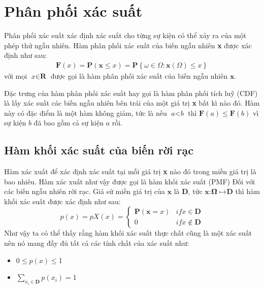 \section{Phân phối xác suất}\label{sec:1.2}
Phân phối xác suất xác định xác suất cho từng sự kiện có thể xảy ra của một phép thử ngẫu nhiên. Hàm phân phối xác suất của biến ngẫu nhiên \textbf{x} được xác định như sau:
\begin{align}
	\textbf{F}(x)=\textbf{P}(\textbf{x}\leq\textit{x})=\textbf{P}\left\{{\omega\in\Omega:\textbf{x}(\Omega)\leq\textit{x}} \right\}
\end{align}
với mọi $\textit{x}\in\textbf{R}$ được gọi là hàm phân phối xác suất của biến ngẫu nhiên $\textbf{x}$.

Đặc trưng của hàm phân phối xác suất hay gọi là hàm phân phối tích luỹ (CDF)
là lấy xác suất các biến ngẫu nhiên bên trái của một giá trị \textbf{x} bất kì nào đó.
Hàm này có đặc điểm là một hàm không giảm, tức là nếu $\textit{a}<\textit{b}$
thì $\textbf{F}(a)\leq\textbf{F}(b)$ vì sự kiện $\textit{b}$ đã bao gồm cả sự kiện $\textit{a}$ rồi.
\par
\subsection{Hàm khối xác suất của biến rời rạc}\label{subsec:1.2.1}
Hàm xác xuất để xác định xác suất tại mỗi giá trị \textbf{x} nào đó trong miền giá trị là bao nhiêu.
Hàm xác xuất như vậy được gọi là hàm khối xác suất (PMF) Đối với các biến ngẫu nhiên rời rạc. 
Giả sử miền giá trị của $\textbf{x}$ là $\textbf{D}$, tức $\textbf{x}$:$\bf\Omega\mapsto$$\textbf{D}$ thì hàm khối xác suất được xác định như sau: 
\begin{equation}
	\textit{p}(x)=\textit{p}\textit{X}(\textit{x})=
	\begin{cases}
	\textbf{P}(\textbf{x}=\textit{x}) &if \textit{x}\in\textbf{D}\\
	0 &if \textit{x}\notin\textbf{D}
	\end{cases}
\end{equation}
Như vậy ta có thể thấy rằng hàm khối xác suất thực chất cũng là một xác suất nên nó mang đầy đủ tất cả các tính chất của xác suất như:
\begin{itemize}
	\item 0$\leq\textit{p}(x)\leq$1
	\item $\sum_{x_i\in\textbf{D}}\textit{p}(x_{i})=$1
\end{itemize}
\par
